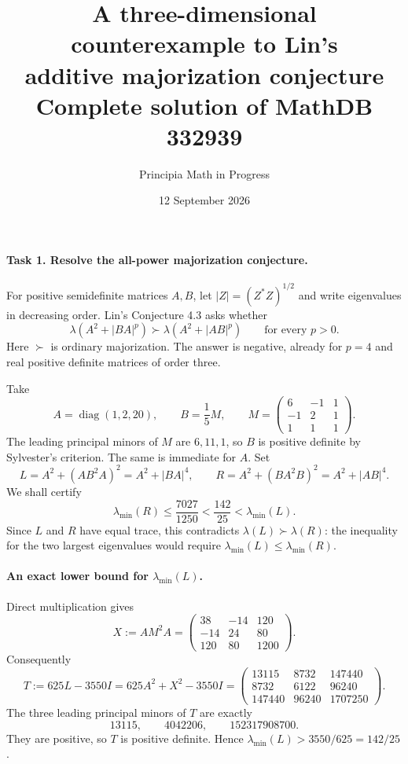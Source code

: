 \documentclass[11pt]{article}
\title{A three-dimensional counterexample to Lin's\\
additive majorization conjecture\\
\large Complete solution of MathDB 332939}
\author{Principia Math in Progress}
\date{12 September 2026}
\newcommand{\lmin}{\lambda_{\min}}
\begin{document}
\maketitle

\paragraph{Task 1. Resolve the all-power majorization conjecture.}
For positive semidefinite matrices $A,B$, let $|Z|=(Z^*Z)^{1/2}$ and
write eigenvalues in decreasing order. Lin's Conjecture 4.3 asks whether
\[
 \lambda(A^2+|BA|^p)\succ\lambda(A^2+|AB|^p)
 \qquad\text{for every }p>0.
\]
Here $\succ$ is ordinary majorization. The answer is negative, already
for $p=4$ and real positive definite matrices of order three.

Take
\[
 A=\operatorname{diag}(1,2,20),\qquad
 B=\frac15 M,\qquad
 M=\begin{pmatrix}6&-1&1\\-1&2&1\\1&1&1\end{pmatrix}.
\]
The leading principal minors of $M$ are $6,11,1$, so $B$ is positive
definite by Sylvester's criterion. The same is immediate for $A$.
Set
\[
 L=A^2+(AB^2A)^2=A^2+|BA|^4,\qquad
 R=A^2+(BA^2B)^2=A^2+|AB|^4.
\]
We shall certify
\begin{equation}\label{separation}
 \lmin(R)\leq\frac{7027}{1250}
 <\frac{142}{25}<\lmin(L).
\end{equation}
Since $L$ and $R$ have equal trace, this contradicts
$\lambda(L)\succ\lambda(R)$: the inequality for the two largest
eigenvalues would require $\lmin(L)\leq\lmin(R)$.

\paragraph{An exact lower bound for \(\lmin(L)\).}
Direct multiplication gives
\[
 X:=AM^2A=
 \begin{pmatrix}38&-14&120\\-14&24&80\\120&80&1200\end{pmatrix}.
\]
Consequently
\[
 T:=625L-3550I
 =625A^2+X^2-3550I
 =\begin{pmatrix}
 13115&8732&147440\\
 8732&6122&96240\\
 147440&96240&1707250
 \end{pmatrix}.
\]
The three leading principal minors of $T$ are exactly
\[
 13115,\qquad 4042206,\qquad 152317908700.
\]
They are positive, so $T$ is positive definite. Hence
$\lmin(L)>3550/625=142/25$.
\end{document}
